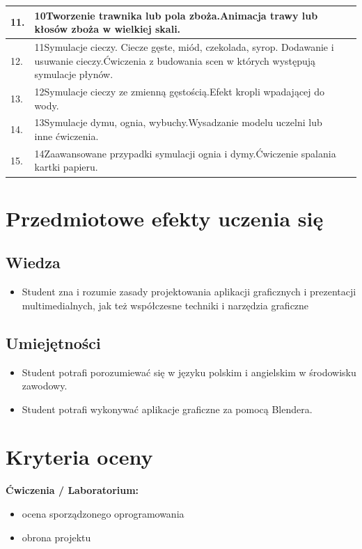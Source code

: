 \documentclass[12pt, a4paper]{article}
\begin{document}
\begin{longtable}{|p{1.5cm}|p{6.5cm}|p{6.5cm}|}
  \hline
  11. & 10Tworzenie trawnika lub pola zboża.Animacja trawy lub kłosów zboża w wielkiej skali. &  \\
  \hline
  12. & 11Symulacje cieczy. Ciecze gęste, miód, czekolada, syrop. Dodawanie i usuwanie cieczy.Ćwiczenia z budowania scen w których występują symulacje płynów. &  \\
  \hline
  13. & 12Symulacje cieczy ze zmienną gęstością.Efekt kropli wpadającej do wody. &  \\
  \hline
  14. & 13Symulacje dymu, ognia, wybuchy.Wysadzanie modelu uczelni lub inne ćwiczenia. &  \\
  \hline
  15. & 14Zaawansowane przypadki symulacji ognia i dymy.Ćwiczenie spalania kartki papieru. &  \\
  \hline
\end{longtable}

\section{Przedmiotowe efekty uczenia się}

\subsection*{Wiedza}
\begin{itemize}
  \item Student zna i rozumie zasady projektowania aplikacji graficznych i prezentacji multimedialnych, jak też współczesne techniki i narzędzia graficzne
\end{itemize}

\subsection*{Umiejętności}
\begin{itemize}
  \item Student potrafi  porozumiewać się w języku polskim i angielskim  w środowisku zawodowy.
  \item Student potrafi  wykonywać aplikacje graficzne za pomocą Blendera.
\end{itemize}

\section{Kryteria oceny}

\textbf{Ćwiczenia / Laboratorium:}
\begin{itemize}
  \item ocena sporządzonego oprogramowania
  \item obrona projektu
\end{itemize}
\end{document}
